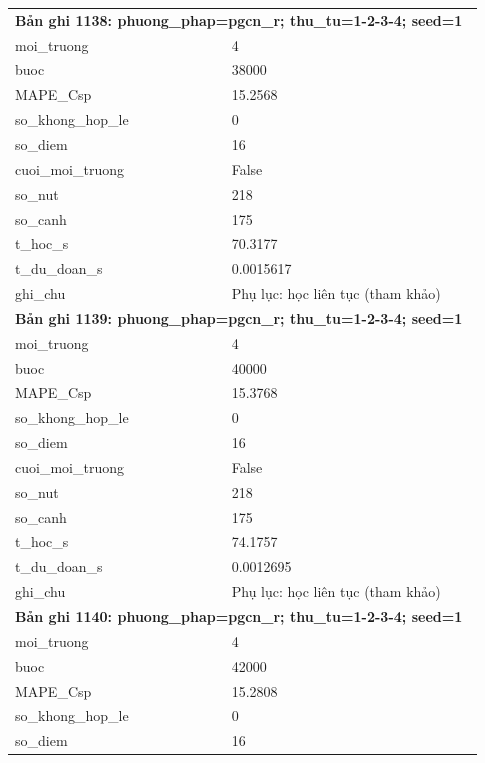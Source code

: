 \begin{longtable}{p{0.43\linewidth}p{0.50\linewidth}}
\midrule
\multicolumn{2}{p{0.95\linewidth}}{\textbf{Bản ghi 1138: phuong\_phap=pgcn\_r; thu\_tu=1-2-3-4; seed=1}} \\
moi\_\allowbreak truong & 4 \\
buoc & 38000 \\
MAPE\_\allowbreak Csp & 15.2568 \\
so\_\allowbreak khong\_\allowbreak hop\_\allowbreak le & 0 \\
so\_\allowbreak diem & 16 \\
cuoi\_\allowbreak moi\_\allowbreak truong & False \\
so\_\allowbreak nut & 218 \\
so\_\allowbreak canh & 175 \\
t\_\allowbreak hoc\_\allowbreak s & 70.3177 \\
t\_\allowbreak du\_\allowbreak doan\_\allowbreak s & 0.0015617 \\
ghi\_\allowbreak chu & Phụ lục: học liên tục (tham khảo) \\
\midrule
\multicolumn{2}{p{0.95\linewidth}}{\textbf{Bản ghi 1139: phuong\_phap=pgcn\_r; thu\_tu=1-2-3-4; seed=1}} \\
moi\_\allowbreak truong & 4 \\
buoc & 40000 \\
MAPE\_\allowbreak Csp & 15.3768 \\
so\_\allowbreak khong\_\allowbreak hop\_\allowbreak le & 0 \\
so\_\allowbreak diem & 16 \\
cuoi\_\allowbreak moi\_\allowbreak truong & False \\
so\_\allowbreak nut & 218 \\
so\_\allowbreak canh & 175 \\
t\_\allowbreak hoc\_\allowbreak s & 74.1757 \\
t\_\allowbreak du\_\allowbreak doan\_\allowbreak s & 0.0012695 \\
ghi\_\allowbreak chu & Phụ lục: học liên tục (tham khảo) \\
\midrule
\multicolumn{2}{p{0.95\linewidth}}{\textbf{Bản ghi 1140: phuong\_phap=pgcn\_r; thu\_tu=1-2-3-4; seed=1}} \\
moi\_\allowbreak truong & 4 \\
buoc & 42000 \\
MAPE\_\allowbreak Csp & 15.2808 \\
so\_\allowbreak khong\_\allowbreak hop\_\allowbreak le & 0 \\
so\_\allowbreak diem & 16 \\

\end{longtable}
